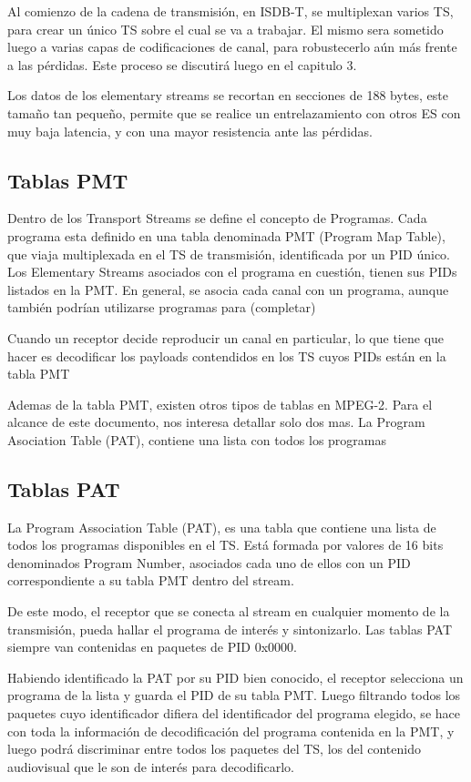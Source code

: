 	Al comienzo de la cadena de transmisión, en ISDB-T, se multiplexan varios TS, para crear un único TS sobre el cual se va a trabajar. El mismo sera sometido luego a varias capas de codificaciones de canal, para robustecerlo aún más frente a las pérdidas. Este proceso se discutirá luego en el capitulo 3.
	
	Los datos de los elementary streams se recortan en secciones de 188 bytes, este tamaño tan pequeño, permite que se realice un entrelazamiento con otros ES con muy baja latencia, y con una mayor resistencia ante las pérdidas.

	\subsection{Tablas PMT}

	Dentro de los Transport Streams se define el concepto de Programas. Cada programa esta definido en una tabla denominada PMT (Program Map Table), que viaja multiplexada en el TS de transmisión, identificada por un PID único. Los Elementary Streams asociados con el programa en cuestión, tienen sus PIDs listados en la PMT. En general, se asocia cada canal con un programa, aunque también podrían utilizarse programas para (completar)
	
	Cuando un receptor decide reproducir un canal en particular, lo que tiene que hacer es decodificar los payloads contendidos en los TS cuyos PIDs están en la tabla PMT
	
	Ademas de la tabla PMT, existen otros tipos de tablas en MPEG-2. Para el alcance de este documento, nos interesa detallar solo dos mas.
	La Program Asociation Table (PAT), contiene una lista con todos los programas 

	
	\subsection{Tablas PAT}
	La Program Association Table (PAT), es una tabla que contiene una lista de todos los programas disponibles en el TS. Está formada por valores de 16 bits denominados Program Number, asociados cada uno de ellos con un PID correspondiente a su tabla PMT dentro del stream. 
	
	De este modo, el receptor que se conecta al stream en cualquier momento de la transmisión, pueda hallar el programa de interés y sintonizarlo. Las tablas PAT siempre van contenidas en paquetes de PID 0x0000.
	
	Habiendo identificado la PAT por su PID bien conocido, el receptor selecciona un programa de la lista y guarda el PID de su tabla PMT. Luego filtrando todos los paquetes cuyo identificador difiera del identificador del programa elegido, se hace con toda la información de decodificación del programa contenida en la PMT, y luego podrá discriminar entre todos los paquetes del TS, los del contenido audiovisual que le son de interés para decodificarlo. 
 
